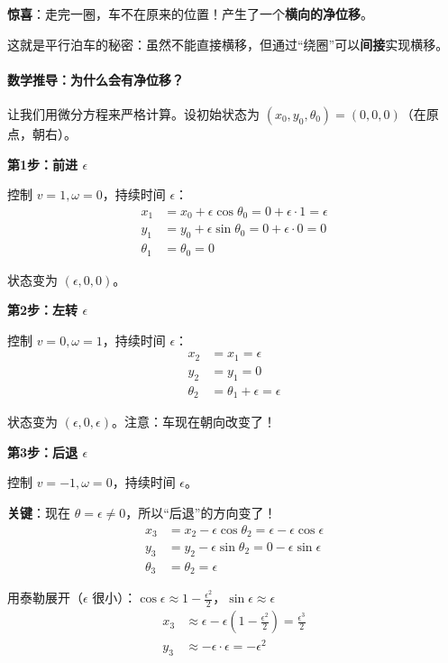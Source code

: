 \textbf{惊喜}：走完一圈，车不在原来的位置！产生了一个\textbf{横向的净位移}。

这就是平行泊车的秘密：虽然不能直接横移，但通过“绕圈”可以\textbf{间接}实现横移。

\paragraph{数学推导：为什么会有净位移？}

让我们用微分方程来严格计算。设初始状态为 $(x_0, y_0, \theta_0) = (0, 0, 0)$（在原点，朝右）。

\textbf{第1步：前进 $\epsilon$}

控制 $v = 1, \omega = 0$，持续时间 $\epsilon$：
\begin{align}
x_1 &= x_0 + \epsilon \cos\theta_0 = 0 + \epsilon \cdot 1 = \epsilon \\
y_1 &= y_0 + \epsilon \sin\theta_0 = 0 + \epsilon \cdot 0 = 0 \\
\theta_1 &= \theta_0 = 0
\end{align}

状态变为 $(\epsilon, 0, 0)$。

\textbf{第2步：左转 $\epsilon$}

控制 $v = 0, \omega = 1$，持续时间 $\epsilon$：
\begin{align}
x_2 &= x_1 = \epsilon \\
y_2 &= y_1 = 0 \\
\theta_2 &= \theta_1 + \epsilon = \epsilon
\end{align}

状态变为 $(\epsilon, 0, \epsilon)$。注意：车现在朝向改变了！

\textbf{第3步：后退 $\epsilon$}

控制 $v = -1, \omega = 0$，持续时间 $\epsilon$。

\textbf{关键}：现在 $\theta = \epsilon \neq 0$，所以“后退”的方向变了！
\begin{align}
x_3 &= x_2 - \epsilon \cos\theta_2 = \epsilon - \epsilon \cos\epsilon \\
y_3 &= y_2 - \epsilon \sin\theta_2 = 0 - \epsilon \sin\epsilon \\
\theta_3 &= \theta_2 = \epsilon
\end{align}

用泰勒展开（$\epsilon$ 很小）：$\cos\epsilon \approx 1 - \frac{\epsilon^2}{2}$，$\sin\epsilon \approx \epsilon$
\begin{align}
x_3 &\approx \epsilon - \epsilon(1 - \frac{\epsilon^2}{2}) = \frac{\epsilon^3}{2} \\
y_3 &\approx -\epsilon \cdot \epsilon = -\epsilon^2
\end{align}

